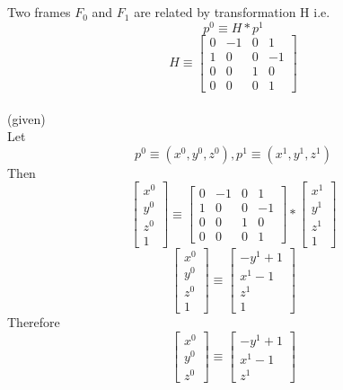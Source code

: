 \documentclass[12pt]{article}
\newcommand{\given}{{\\ \color{blue} \hspace*{\fill}(given)} \\}
\begin{document}
\pagebreak

\section{}

\pagebreak

\section{}
Two frames $F_0$ and $F_1$ are related by transformation H i.e.
\[
  p^0 \equiv H * p^1
\]
\[
  H \equiv
  \begin{bmatrix} 0 & -1 & 0 & 1 \\ 1 & 0 & 0 & -1 \\ 0 & 0 & 1 & 0 \\ 0 & 0 & 0 & 1 \end{bmatrix}
\]
\given
Let
\[
  p^0 \equiv (x^0, y^0, z^0), p^1 \equiv (x^1, y^1, z^1)
\]
Then
\[
  \begin{bmatrix} x^0 \\ y^0 \\ z^0 \\ 1\end{bmatrix} \equiv
  \begin{bmatrix} 0 & -1 & 0 & 1 \\ 1 & 0 & 0 & -1 \\ 0 & 0 & 1 & 0 \\ 0 & 0 & 0 & 1 \end{bmatrix}
  *
  \begin{bmatrix} x^1 \\ y^1 \\ z^1 \\ 1\end{bmatrix}
\]
\[
  \begin{bmatrix} x^0 \\ y^0 \\ z^0 \\ 1\end{bmatrix} \equiv
  \begin{bmatrix} -y^1 + 1 \\ x^1 - 1 \\ z^1 \\ 1\end{bmatrix}
\]
Therefore
\[
  \begin{bmatrix} x^0 \\ y^0 \\ z^0\end{bmatrix} \equiv
  \begin{bmatrix} -y^1 + 1 \\ x^1 - 1 \\ z^1\end{bmatrix}
\]
\end{document}
